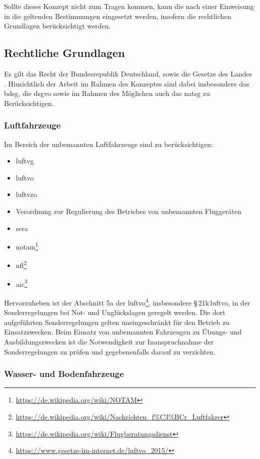 \noindent Sollte dieses Konzept nicht zum Tragen kommen, kann die \specialistGroup{} nach einer Einweisung in die geltenden Bestimmungen eingesetzt werden, insofern die rechtlichen Grundlagen berücksichtigt werden.

\subsection{Rechtliche Grundlagen}

Es gilt das Recht der Bundesrepublik Deutschland, sowie die Gesetze des Landes \state{}. Hinsichtlich der Arbeit im Rahmen des Konzeptes sind dabei insbesondere das \acf{bdsg}, die \acf{dsgvo} sowie im Rahmen des Möglichen auch das \acf{natsg} zu Berücksichtigen.

\subsubsection{Luftfahrzeuge}

Im Bereich der unbemannten Luftfahrzeuge sind zu berücksichtigen:
\begin{itemize}
\item \acf{luftvg}
\item \acf{luftvo}
\item \acf{luftvzo}
\item Verordnung zur Regulierung des Betriebes von unbemannten Fluggeräten
\item \acf{sera}
\item \acf{notam}\footnote{\url{https://de.wikipedia.org/wiki/NOTAM}}
\item \acf{nfl}\footnote{\url{https://de.wikipedia.org/wiki/Nachrichten_f\%C3\%BCr_Luftfahrer}}
\item \acf{aic}\footnote{\url{https://de.wikipedia.org/wiki/Flugberatungsdienst}}
\end{itemize}

\noindent Hervorzuheben ist der Abschnitt 5a der \ac{luftvo}\footnote{\url{https://www.gesetze-im-internet.de/luftvo_2015/}}, insbesondere §\,21k\,\ac{luftvo}, in der Sonderregelungen bei Not- und Unglückslagen geregelt werden. Die dort aufgeführten Sonderregelungen gelten uneingeschränkt für den Betrieb zu Einsatzzwecken. Beim Einsatz von unbemannten Fahrzeugen zu Übungs- und Ausbildungszwecken ist die Notwendigkeit zur Inanspruchnahme der Sonderregelungen zu prüfen und gegebenenfalls darauf zu verzichten.

\subsubsection{Wasser- und Bodenfahrzeuge}

